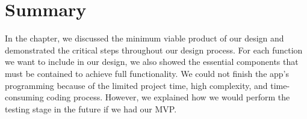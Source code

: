 \section{Summary}
In the chapter, we discussed the minimum viable product of our design and demonstrated the critical steps throughout our design process. For each function we want to include in our design, we also showed the essential components that must be contained to achieve full functionality. We could not finish the app's programming because of the limited project time, high complexity, and time-consuming coding process. However, we explained how we would perform the testing stage in the future if we had our MVP.